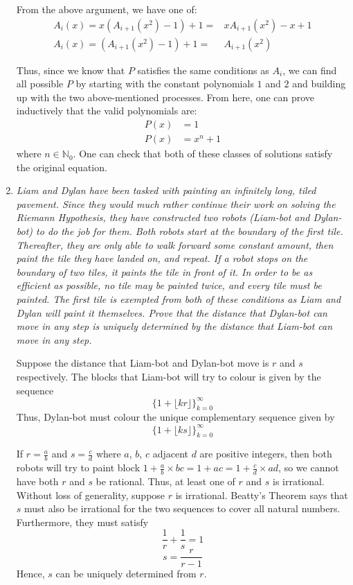 \documentclass{article}
\begin{document}
\begin{enumerate}
From the above argument, we have one of: 
\begin{align*}
    A_i(x) = x(A_{i + 1}(x^2) - 1) + 1 =& xA_{i + 1}(x^2) - x + 1 \\
    A_i(x) = (A_{i + 1}(x^2) - 1) + 1 =& A_{i + 1}(x^2)
\end{align*}

Thus, since we know that $P$ satisfies the same conditions as $A_i$, we can find all possible $P$ by starting with the constant polynomials $1$ and $2$ and building up with the two above-mentioned processes. From here, one can prove inductively that the valid polynomials are:
\begin{align*}
P(x) &= 1\\
P(x) &= x^n + 1
\end{align*}
where $n \in \mathbb{N}_0$. One can check that both of these classes of solutions satisfy the original equation.

\medskip
\item %
{\itshape Liam and Dylan have been tasked with painting an infinitely long, tiled pavement. Since they would much rather continue their work on solving the Riemann Hypothesis, they have constructed two robots (Liam-bot and Dylan-bot) to do the job for them. Both robots start at the boundary of the first tile. Thereafter, they are only able to walk forward some constant amount, then paint the tile they have landed on, and repeat. If a robot stops on the boundary of two tiles, it paints the tile in front of it. In order to be as efficient as possible, no tile may be painted twice, and every tile must be painted. The first tile is exempted from both of these conditions as Liam and Dylan will paint it themselves. Prove that the distance that Dylan-bot can move in any step is uniquely determined by the distance that Liam-bot can move in any step.
}

Suppose the distance that Liam-bot and Dylan-bot move is $r$ and $s$ respectively. The blocks that Liam-bot will try to colour is given by the sequence
$$\{1 + \lfloor kr \rfloor\}_{k=0}^{\infty} $$
Thus, Dylan-bot must colour the unique complementary sequence given by
$$\{1 + \lfloor ks \rfloor\}_{k=0}^{\infty} $$

If $r = \frac{a}{b}$ and $s = \frac{c}{d}$ where $a$, $b$, $c$ adjacent $d$ are positive integers, then both robots will try to paint block $1 + \frac{a}{b} \times bc = 1 + ac = 1 + \frac{c}{d} \times ad$, so we cannot have both $r$ and $s$ be rational. Thus, at least one of $r$ and $s$ is irrational. Without loss of generality, suppose $r$ is irrational. Beatty's Theorem says that $s$ must also be irrational for the two sequences to cover all natural numbers. Furthermore, they must satisfy
$$\frac{1}{r} + \frac{1}{s} = 1$$
$$ s = \frac{r}{r - 1}$$
Hence, $s$ can be uniquely determined from $r$.



\end{enumerate}
\end{document}
